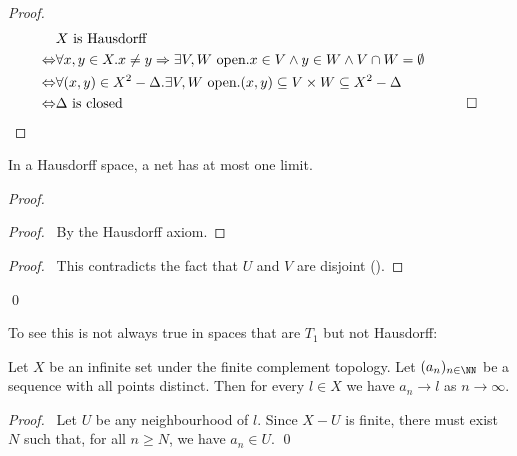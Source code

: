 \begin{proof}
    \pf
    \begin{align*}
        & X \text{ is Hausdorff} \\
        \Leftrightarrow & \forall x,y \in X. x \neq y \Rightarrow \exists V, W \text{ open}. x \in V \wedge y \in W \wedge V \cap W = \emptyset \\
        \Leftrightarrow & \forall (x,y) \in X^2 - \Delta. \exists V,W \text{ open}. (x,y) \subseteq V \times W \subseteq X^2 - \Delta \\
        \Leftrightarrow & \Delta \text{ is closed} & \qed
    \end{align*}
\end{proof}

\begin{theorem}
    In a Hausdorff space, a net has at most one limit.
\end{theorem}

\begin{proof}
    \pf
    \begin{proof}
        \pf\ By the Hausdorff axiom.
    \end{proof}
    \qedstep
    \begin{proof}
        \pf\ This contradicts the fact that $U$ and $V$ are disjoint ().
    \end{proof}
    \qed
\end{proof}

To see this is not always true in spaces that are $T_1$ but not Hausdorff:

\begin{proposition}
    Let $X$ be an infinite set under the finite complement topology. Let $(a_n)_{n \in \NN}$ be a sequence
    with all points distinct. Then for every $l \in X$ we have $a_n \rightarrow l$ as
    $n \rightarrow \infty$.
\end{proposition}

\begin{proof}
    \pf\ Let $U$ be any neighbourhood of $l$. Since $X - U$ is finite, there must exist $N$
    such that, for all $n \geq N$, we have $a_n \in U$. \qed
\end{proof}

